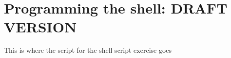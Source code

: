 \chapter{Programming the shell: DRAFT VERSION}


\begin{note}
  This is where the script for the shell script exercise goes

\end{note}

